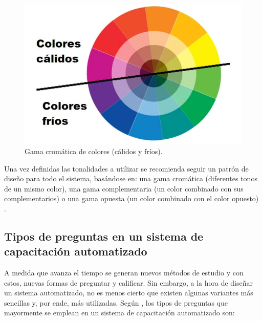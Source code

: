 \begin{figure}[h]
\centering
 \includegraphics[width=0.6\linewidth]{imagen/gama.png}
 \caption{Gama cromática de colores (cálidos y fríos).}
 \label{fig:colores} 
\end{figure}

Una vez definidas las tonalidades a utilizar se recomienda seguir un patrón de diseño para todo el sistema, basándose en: una gama cromática (diferentes tonos de un mismo color), una gama complementaria (un color combinado con sus complementarios) o una gama opuesta (un color combinado con el color opuesto) \cite{TerronLopez2022}.

\subsection{Tipos de preguntas en un sistema de capacitación automatizado}
A medida que avanza el tiempo se generan nuevos métodos de estudio y con estos, nuevas formas de preguntar y calificar. Sin embargo, a la hora de diseñar un sistema automatizado, no es menos cierto que existen algunas variantes más sencillas y, por ende, más utilizadas. Según \cite{Laguna2016}, los tipos de preguntas que mayormente se emplean en un sistema de capacitación automatizado son:

